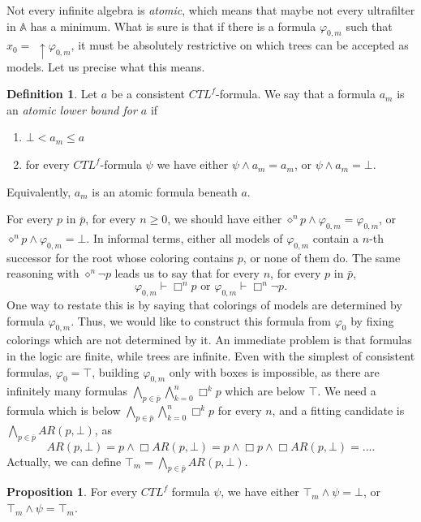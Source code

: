 \documentclass[11pt]{article}
\newcommand{\A}{{\mathbb{A}}}
\theoremstyle{definition}
\newtheorem*{definition}{Definition}
\newtheorem*{proposition}{Proposition}
\begin{document}
\subsubsection*{}
Not every infinite algebra is \emph{atomic}, which means that maybe not every ultrafilter in $\A$ has a minimum.
What is sure is that if there is a formula $\varphi_{0,m}$ such that $x_0 =$ $\uparrow\varphi_{0,m}$,
it must be absolutely restrictive on which trees can be accepted as models. Let us precise what this means. 
\begin{definition}\label{phi_m}
    Let $a$ be a consistent $CTL^f$-formula. We say that a formula $a_m$ is an \emph{atomic lower bound for $a$} if 
    \begin{enumerate}
        \item $\bot<a_m\leq a$
        \item for every $CTL^f$-formula $\psi$ we have either $\psi\wedge a_m=a_m$, or $\psi\wedge a_m=\bot$.
    \end{enumerate}
    Equivalently, $a_m$ is an atomic formula beneath $a$.
\end{definition}
For every $p$ in $\bar{p}$, for every $n \geq 0$, we should have either $\diamond^np \wedge \varphi_{0,m} = \varphi_{0,m}$, 
or $\diamond^np \wedge \varphi_{0,m} =\bot$. In informal terms, either all models of $\varphi_{0,m}$ contain a $n$-th successor 
for the root whose coloring contains $p$, or none of them do. The same reasoning with $\diamond^n\neg p$ leads us to say that for every $n$, 
for every $p$ in $\bar{p}$, \[\varphi_{0,m}\vdash\Box^n p\mbox{ or } \varphi_{0,m}\vdash\Box^n\neg p.\]
One way to restate this is by saying that colorings of models are determined by formula $\varphi_{0,m}$. Thus, we would like to construct this formula from $\varphi_0$ by fixing colorings which are not determined by it. An immediate problem is that formulas in the logic are finite, while trees are infinite. Even with the simplest of consistent formulas, $\varphi_0 = \top$, building $\varphi_{0,m}$ only with boxes is impossible, as there are infinitely many formulas $\bigwedge_{p\in\bar{p}}\bigwedge_{k=0}^n\Box^k p$ which are below $\top$. We need a formula which is below $\bigwedge_{p\in\bar{p}}\bigwedge_{k=0}^n\Box^k p$ for every $n$, and a fitting candidate is $\bigwedge_{p\in\bar{p}}AR(p,\bot)$, as \[AR(p,\bot)=p\wedge\Box AR(p,\bot)=p\wedge\Box p\wedge \Box AR(p,\bot)=... .\] Actually, we can define $\top_m=\bigwedge_{p\in\bar{p}}AR(p,\bot)$. 
\begin{proposition}\label{top_m}
    For every $CTL^f$ formula $\psi$, we have either $\top_m\wedge\psi=\bot$, or $\top_m\wedge\psi=\top_m$.
\end{proposition}
\end{document}
